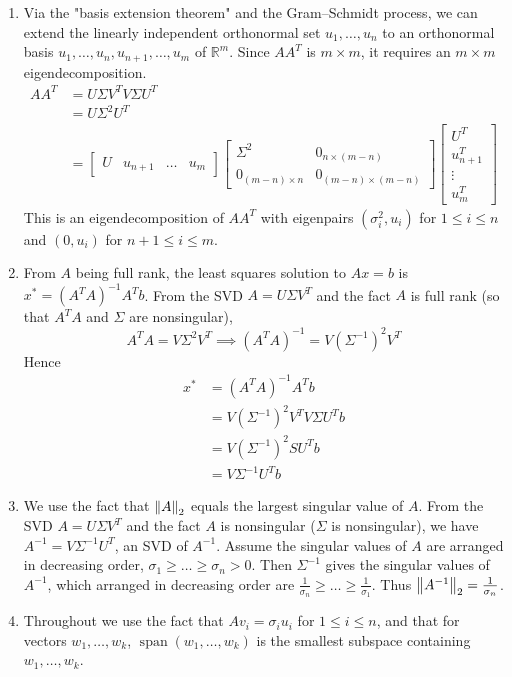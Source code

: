\documentclass{article}
\def\mbb#1{\mathbb{#1}}
\def\bR{\mbb{R}}
\newcommand{\sbr}[1]{\left[#1\right]}
\newcommand{\arr}[3][\sbr]{#1{\begin{array}{#2}#3\end{array}}}
\DeclareMathOperator{\Span}{span}
\newcommand{\s}{\sigma}
\renewcommand{\S}{\Sigma}
\newcommand{\inv}{^{-1}}
\newcommand{\imp}{\implies}
\begin{document}
\begin{enumerate}
\begin{enumerate}
		\item Via the "basis extension theorem" and the Gram--Schmidt process, we can extend the linearly independent orthonormal set $u_1,\dots,u_n$ to an orthonormal basis $u_1,\dots,u_n,u_{n+1},\dots,u_m$ of $\bR^m$. Since $AA^T$ is $m\times m$, it requires an $m\times m$ eigendecomposition.
		\begin{align*}
			AA^T &= U\S V^TV\S U^T \\
			&= U\S^2U^T \\
			&= \arr{c|c|c|c}{U & u_{n+1} & \dots & u_m}
				\arr{c|c}{
				\S^2 & 0_{n\times(m-n)} \\
				\hline
				0_{(m-n)\times n} & 0_{(m-n)\times(m-n)}
				}
				\arr{c}{U^T \\ \hline u_{n+1}^T \\ \hline \vdots \\ \hline u_m^T}			
		\end{align*}
		This is an eigendecomposition of $AA^T$ with eigenpairs $(\s_i^2,u_i)$ for $1\le i\le n$ and $(0,u_i)$ for $n+1\le i\le m$.
		
		
		
		\item From $A$ being full rank, the least squares solution to $Ax=b$ is $x^*=(A^TA)\inv A^Tb$. From the SVD $A=U\S V^T$ and the fact $A$ is full rank (so that $A^TA$ and $\S$ are nonsingular),
		\[A^TA = V\S^2V^T
		\imp (A^TA)\inv = V(\S\inv)^2 V^T\]
		Hence
		\begin{align*}
			x^* &= (A^TA)\inv A^Tb \\
			&= V(\S\inv)^2 V^TV\S U^Tb \\
			&= V(\S\inv)^2SU^Tb \\
			&= V\S\inv U^Tb
		\end{align*}
		
		
		
		\item We use the fact that $\norm{A}_2$ equals the largest singular value of $A$. From the SVD $A=U\S V^T$ and the fact $A$ is nonsingular ($\S$ is nonsingular), we have $A\inv=V\S\inv U^T$, an SVD of $A\inv$. Assume the singular values of $A$ are arranged in decreasing order, $\s_1\ge\dots\ge\s_n>0$. Then $\S\inv$ gives the singular values of $A\inv$, which arranged in decreasing order are $\frac{1}{\s_n}\ge\dots\ge\frac{1}{\s_1}$. Thus $\norm{A\inv}_2=\frac{1}{\s_n}$.
		
		
		
		\item Throughout we use the fact that $Av_i=\s_iu_i$ for $1\le i\le n$, and that for vectors $w_1,\dots,w_k$, $\Span(w_1,\dots,w_k)$ is the smallest subspace containing $w_1,\dots,w_k$.
		

\end{enumerate}
\end{enumerate}
\end{document}
